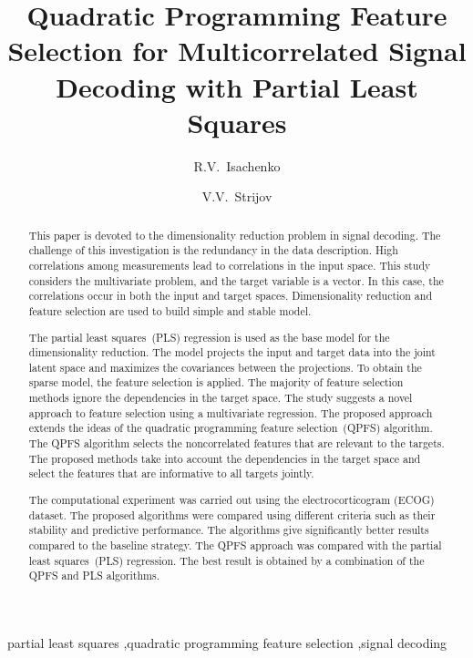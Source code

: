 \documentclass[preprint,12pt]{elsarticle}
\theoremstyle{definition}
\begin{document}
	\begin{frontmatter}
		\title{Quadratic Programming Feature Selection for Multicorrelated Signal Decoding with Partial Least Squares}
		\author[mipt]{R.V.~Isachenko}
		\author[ccas]{V.V.~Strijov}
		
		\address[mipt]{
			Moscow Institute of Physics and Technology, 9 Institutskiy Per., Dolgoprudny, Moscow Region 141700, Russian Federation}
		\address[ccas]{A. A. Dorodnicyn Computing Centre, Federal Research Center “Computer Science and Control” of the Russian Academy of Sciences, 40 Vavilov Str., Moscow 119333, Russian Federation}
		
		\begin{abstract} 
			This paper is devoted to the dimensionality reduction problem in signal decoding.
			The challenge of this investigation is the redundancy in the data description. 
			High correlations among measurements lead to correlations in the input space. 
			This study considers the multivariate problem, and the target variable is a vector.
			In this case, the correlations occur in both the input and target spaces.
			Dimensionality reduction and feature selection are used to build simple and stable model.
			
			The partial least squares~(PLS) regression is used as the base model for the dimensionality reduction.
			The model projects the input and target data into the joint latent space and maximizes the covariances between the projections.
			To obtain the sparse model, the feature selection is applied.
			The majority of feature selection methods ignore the dependencies in the target space.
			The study suggests a novel approach to feature selection using a multivariate regression.
			The proposed approach extends the ideas of the quadratic programming feature selection~(QPFS) algorithm. 
			The QPFS algorithm selects the noncorrelated features that are relevant to the targets. 
			The proposed methods take into account the dependencies in the target space and select the features that are informative to all targets jointly.
			
			The computational experiment was carried out using the electrocorticogram (ECOG) dataset. 
			The proposed algorithms were compared using different criteria such as their stability and predictive performance.
			The algorithms give significantly better results compared to the baseline strategy.
			The QPFS approach was compared with the partial least squares~(PLS) regression.
			The best result is obtained by a combination of the QPFS and PLS algorithms.
			
		\end{abstract}
		\begin{keyword}
			partial least squares \sep quadratic programming feature selection \sep signal decoding
		\end{keyword}
	\end{frontmatter}
\end{document}

